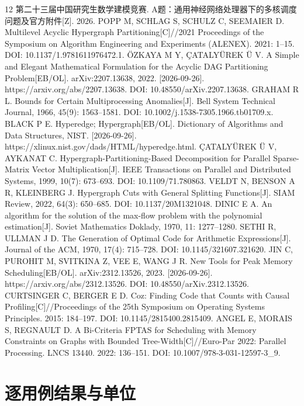 \documentclass[anonymous,notoc]{gmcm2026}
\begin{document}
\FloatBarrier
\begin{thebibliography}{12}
 第二十三届中国研究生数学建模竞赛. A题：通用神经网络处理器下的多核调度问题及官方附件{[}Z{]}. 2026.
 POPP M, SCHLAG S, SCHULZ C, SEEMAIER D. Multilevel Acyclic Hypergraph Partitioning{[}C{]}//2021 Proceedings of the Symposium on Algorithm Engineering and Experiments (ALENEX). 2021: 1--15. DOI: 10.1137/1.9781611976472.1.
 ÖZKAYA M Y, ÇATALYÜREK Ü V. A Simple and Elegant Mathematical Formulation for the Acyclic DAG Partitioning Problem{[}EB/OL{]}. arXiv:2207.13638, 2022. {[}2026-09-26{]}. https://arxiv.org/abs/2207.13638. DOI: 10.48550/arXiv.2207.13638.
 GRAHAM R L. Bounds for Certain Multiprocessing Anomalies{[}J{]}. Bell System Technical Journal, 1966, 45(9): 1563--1581. DOI: 10.1002/j.1538-7305.1966.tb01709.x.
 BLACK P E. Hyperedge; Hypergraph{[}EB/OL{]}. Dictionary of Algorithms and Data Structures, NIST. {[}2026-09-26{]}. https://xlinux.nist.gov/dads/HTML/hyperedge.html.
 ÇATALYÜREK Ü V, AYKANAT C. Hypergraph-Partitioning-Based Decomposition for Parallel Sparse-Matrix Vector Multiplication{[}J{]}. IEEE Transactions on Parallel and Distributed Systems, 1999, 10(7): 673--693. DOI: 10.1109/71.780863.
 VELDT N, BENSON A R, KLEINBERG J. Hypergraph Cuts with General Splitting Functions{[}J{]}. SIAM Review, 2022, 64(3): 650--685. DOI: 10.1137/20M1321048.
 DINIC E A. An algorithm for the solution of the max-flow problem with the polynomial estimation{[}J{]}. Soviet Mathematics Doklady, 1970, 11: 1277--1280.
 SETHI R, ULLMAN J D. The Generation of Optimal Code for Arithmetic Expressions{[}J{]}. Journal of the ACM, 1970, 17(4): 715--728. DOI: 10.1145/321607.321620.
 JIN C, PUROHIT M, SVITKINA Z, VEE E, WANG J R. New Tools for Peak Memory Scheduling{[}EB/OL{]}. arXiv:2312.13526, 2023. {[}2026-09-26{]}. https://arxiv.org/abs/2312.13526. DOI: 10.48550/arXiv.2312.13526.
 CURTSINGER C, BERGER E D. Coz: Finding Code that Counts with Causal Profiling{[}C{]}//Proceedings of the 25th Symposium on Operating Systems Principles. 2015: 184--197. DOI: 10.1145/2815400.2815409.
 ANGEL E, MORAIS S, REGNAULT D. A Bi-Criteria FPTAS for Scheduling with Memory Constraints on Graphs with Bounded Tree-Width{[}C{]}//Euro-Par 2022: Parallel Processing. LNCS 13440. 2022: 136--151. DOI: 10.1007/978-3-031-12597-3\_9.
\end{thebibliography}

\appendix
\section{逐用例结果与单位}
\end{document}
